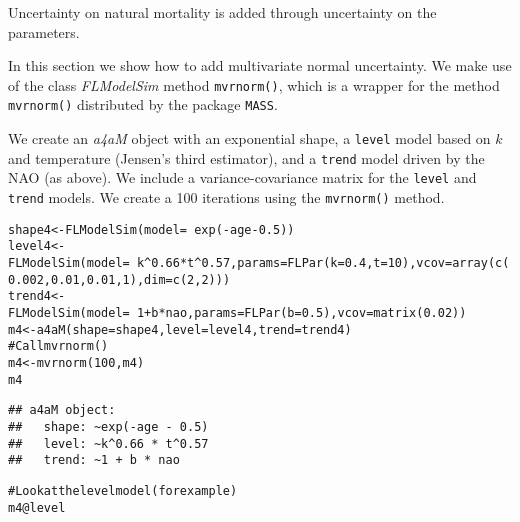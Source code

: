 \documentclass[a4paper,english,10pt]{article}\usepackage[]{graphicx}\usepackage[]{color}
\makeatletter
\newcommand{\hlnum}[1]{\textcolor[rgb]{0.2,0.2,0.2}{#1}}%
\newcommand{\hlcom}[1]{\textcolor[rgb]{0.2,0.267,0.4}{#1}}%
\newcommand{\hlopt}[1]{\textcolor[rgb]{0.2,0.2,0.2}{#1}}%
\newcommand{\hlstd}[1]{\textcolor[rgb]{0,0,0}{#1}}%
\newcommand{\hlkwb}[1]{\textcolor[rgb]{0.361,0.506,0.596}{#1}}%
\newcommand{\hlkwc}[1]{\textcolor[rgb]{0.361,0.506,0.596}{#1}}%
\newcommand{\hlkwd}[1]{\textcolor[rgb]{0.361,0.506,0.596}{#1}}%
\newenvironment{kframe}{%
 \def\at@end@of@kframe{}%
 \ifinner\ifhmode%
  \def\at@end@of@kframe{\end{minipage}}%
  \begin{minipage}{\columnwidth}%
 \fi\fi%
 \def\FrameCommand##1{\hskip\@totalleftmargin \hskip-\fboxsep
 \colorbox{shadecolor}{##1}\hskip-\fboxsep
     \hskip-\linewidth \hskip-\@totalleftmargin \hskip\columnwidth}%
 \MakeFramed {\advance\hsize-\width
   \@totalleftmargin\z@ \linewidth\hsize
   \@setminipage}}%
 {\par\unskip\endMakeFramed%
 \at@end@of@kframe}
\newenvironment{knitrout}{}{} %
\newcommand{\code}[1]{{\texttt{#1}}}
\newcommand{\pkg}[1]{{\texttt{#1}}}
\newcommand{\class}[1]{{\textit{#1}}}
\makeatother
\begin{document}
Uncertainty on natural mortality is added through uncertainty on the parameters.

In this section we show how to add multivariate normal uncertainty. We make use of the class \class{FLModelSim} method \code{mvrnorm()}, which is a wrapper for the method \code{mvrnorm()} distributed by the package \pkg{MASS}.

We create an \class{a4aM} object with an exponential shape, a \code{level} model based on $k$ and temperature (Jensen's third estimator), and a \code{trend} model driven by the NAO (as above). We include a variance-covariance matrix for the \code{level} and \code{trend} models. We create a 100 iterations using the \code{mvrnorm()} method.

\begin{knitrout}
\color{fgcolor}\begin{kframe}
\begin{alltt}
\hlstd{shape4} \hlkwb{<-} \hlkwd{FLModelSim}\hlstd{(}\hlkwc{model}\hlstd{=}\hlopt{~}\hlkwd{exp}\hlstd{(}\hlopt{-}\hlstd{age}\hlopt{-}\hlnum{0.5}\hlstd{))}
\hlstd{level4} \hlkwb{<-} \hlkwd{FLModelSim}\hlstd{(}\hlkwc{model}\hlstd{=}\hlopt{~}\hlstd{k}\hlopt{^}\hlnum{0.66}\hlopt{*}\hlstd{t}\hlopt{^}\hlnum{0.57}\hlstd{,} \hlkwc{params}\hlstd{=}\hlkwd{FLPar}\hlstd{(}\hlkwc{k}\hlstd{=}\hlnum{0.4}\hlstd{,} \hlkwc{t}\hlstd{=}\hlnum{10}\hlstd{),} \hlkwc{vcov}\hlstd{=}\hlkwd{array}\hlstd{(}\hlkwd{c}\hlstd{(}\hlnum{0.002}\hlstd{,} \hlnum{0.01}\hlstd{,}\hlnum{0.01}\hlstd{,} \hlnum{1}\hlstd{),} \hlkwc{dim}\hlstd{=}\hlkwd{c}\hlstd{(}\hlnum{2}\hlstd{,}\hlnum{2}\hlstd{)))}
\hlstd{trend4} \hlkwb{<-} \hlkwd{FLModelSim}\hlstd{(}\hlkwc{model}\hlstd{=}\hlopt{~}\hlnum{1}\hlopt{+}\hlstd{b}\hlopt{*}\hlstd{nao,} \hlkwc{params}\hlstd{=}\hlkwd{FLPar}\hlstd{(}\hlkwc{b}\hlstd{=}\hlnum{0.5}\hlstd{),} \hlkwc{vcov}\hlstd{=}\hlkwd{matrix}\hlstd{(}\hlnum{0.02}\hlstd{))}
\hlstd{m4} \hlkwb{<-} \hlkwd{a4aM}\hlstd{(}\hlkwc{shape}\hlstd{=shape4,} \hlkwc{level}\hlstd{=level4,} \hlkwc{trend}\hlstd{=trend4)}
\hlcom{# Call mvrnorm()}
\hlstd{m4} \hlkwb{<-} \hlkwd{mvrnorm}\hlstd{(}\hlnum{100}\hlstd{, m4)}
\hlstd{m4}
\end{alltt}
\begin{verbatim}
## a4aM object:
##   shape: ~exp(-age - 0.5)
##   level: ~k^0.66 * t^0.57
##   trend: ~1 + b * nao
\end{verbatim}
\begin{alltt}
\hlcom{# Look at the level model (for example)}
\hlstd{m4}\hlopt{@}\hlkwc{level}
\end{alltt}

\end{kframe}
\end{knitrout}
\end{document}
